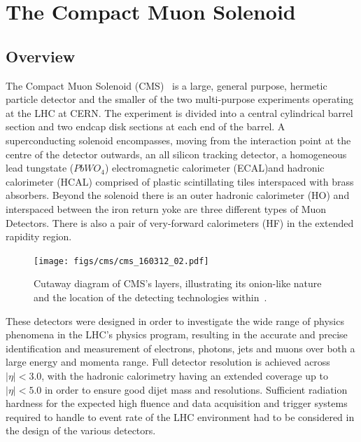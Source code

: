 \section{The Compact Muon Solenoid}\label{sec:cms}
\subsection{Overview}
The Compact Muon Solenoid (CMS)~\cite{oldcms} is a large, general purpose, hermetic particle detector and the smaller of the two multi-purpose experiments operating at the LHC at CERN.
The experiment is divided into a central cylindrical barrel section and two endcap disk sections at each end of the barrel.
A superconducting solenoid encompasses, moving from the interaction point at the centre of the detector outwards, an all silicon tracking detector, a homogeneous lead tungstate ($PbWO_{4}$) electromagnetic calorimeter (ECAL)and hadronic calorimeter (HCAL) comprised of plastic scintillating tiles interspaced with brass absorbers.
Beyond the solenoid there is an outer hadronic calorimeter (HO) and interspaced between the iron return yoke are three different types of Muon Detectors.
There is also a pair of very-forward calorimeters (HF) in the extended rapidity region.

\begin{figure}[htbp]
\begin{center}
\texttt{[image: figs/cms/cms\_160312\_02.pdf]}
\caption{Cutaway diagram of CMS’s layers, illustrating its onion-like nature and the location of the detecting technologies within~\cite{Sakuma:2013jqa}.}
\label{fig:cms-cutaway}
\end{center}
\end{figure}

These detectors were designed in order to investigate the wide range of physics phenomena in the LHC's physics program, resulting in the accurate and precise identification and measurement of electrons, photons, jets and muons over both a large energy and momenta range.
Full detector resolution is achieved across $|\eta| < 3.0$, with the hadronic calorimetry having an extended coverage up to $|\eta| < 5.0$ in order to ensure good dijet mass and \MET resolutions.
Sufficient radiation hardness for the expected high fluence and data acquisition and trigger systems required to handle to event rate of the LHC environment had to be considered in the design of the various detectors.


